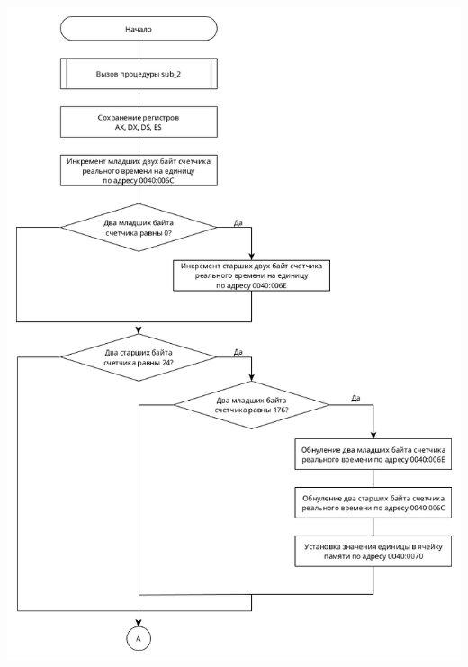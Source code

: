 \documentclass[14pt, a4paper]{article}
\begin{document}
	\begin{minipage}{0.9\linewidth}
		\includegraphics[width=\linewidth]{diagram1_1}
	\end{minipage}

	\pagebreak
	
\end{document}
